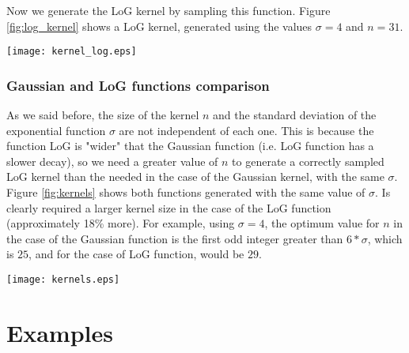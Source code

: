 \documentclass{ipol}
\numberwithin{equation}{section}
\numberwithin{table}{section}
\begin{document}
Now we generate the LoG kernel by sampling this function. Figure \ref{fig:log_kernel} shows a LoG kernel, generated using the 
values $\sigma=4$ and $n=31$.\\

\begin{SCfigure}[][!t]
	\centering
	\texttt{[image: kernel\_log.eps]}
	\caption{Laplacian of a Gaussian kernel, $\sigma=4$, $n=31$. The selected value of n is sufficient 
to have a good approximation of the LoG function in the kernel, but is greater than in the case of 
Gaussian kernel.}
	\label{fig:log_kernel}
\end{SCfigure}

\subsubsection{Gaussian and LoG functions comparison}

As we said before, the size of the kernel $n$ and the standard deviation of the exponential function 
$\sigma$ are not independent of each one. This is because the function LoG is "wider" that the 
Gaussian function (i.e. LoG function has a slower decay), so we need a greater value of $n$ to 
generate a correctly sampled LoG kernel than the needed in the case of the Gaussian kernel, with the same $\sigma$.\\

Figure \ref{fig:kernels} shows both functions generated with the same value of $\sigma$. Is clearly 
required a larger kernel size in the case of the LoG function (approximately 18\% more). For 
example, using $\sigma=4$, the optimum value for $n$ in the case of the Gaussian function is the 
first odd integer greater than $6*\sigma$, which is $25$, and for the case of LoG function, would 
be $29$.\\

\begin{SCfigure}[][!b]
	\centering
	\texttt{[image: kernels.eps]}
	\caption{Comparison of the Gaussian and LoG functions.}
	\label{fig:kernels}
\end{SCfigure}

\section{Examples}
\label{sec:examples}

\end{document}
